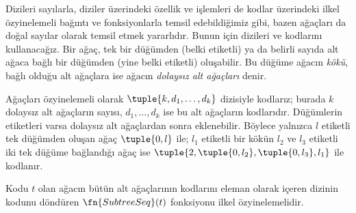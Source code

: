 \documentclass[../../../include/open-logic-section]{subfiles}
\begin{document}

Dizileri sayılarla, diziler üzerindeki özellik ve işlemleri de kodlar
üzerindeki ilkel özyinelemeli bağıntı ve fonksiyonlarla temsil edebildiğimiz
gibi, bazen ağaçları da doğal sayılar olarak temsil etmek yararlıdır. Bunun
için dizileri ve kodlarını kullanacağız. Bir ağaç, tek bir düğümden (belki
etiketli) ya da belirli sayıda alt ağaca bağlı bir düğümden (yine belki
etiketli) oluşabilir. Bu düğüme ağacın \emph{kökü}, bağlı olduğu alt ağaçlara
ise ağacın \emph{dolaysız alt ağaçları} denir.

Ağaçları özyinelemeli olarak $\tuple{k,d_1,\dots,d_k}$ dizisiyle kodlarız;
burada $k$ dolaysız alt ağaçların sayısı, $d_1,\dots,d_k$ ise bu alt ağaçların
kodlarıdır. Düğümlerin etiketleri varsa dolaysız alt ağaçlardan sonra
eklenebilir. Böylece yalnızca $l$ etiketli tek düğümden oluşan ağaç
$\tuple{0,l}$ ile; $l_1$ etiketli bir kökün $l_2$ ve $l_3$ etiketli iki tek
düğüme bağlandığı ağaç ise
$\tuple{2,\tuple{0,l_2},\tuple{0,l_3},l_1}$ ile kodlanır.

\begin{prop}
  Kodu $t$ olan ağacın bütün alt ağaçlarının kodlarını eleman olarak içeren
  dizinin kodunu döndüren $\fn{SubtreeSeq}(t)$ fonksiyonu ilkel
  özyinelemelidir.
\end{prop}
\end{document}
